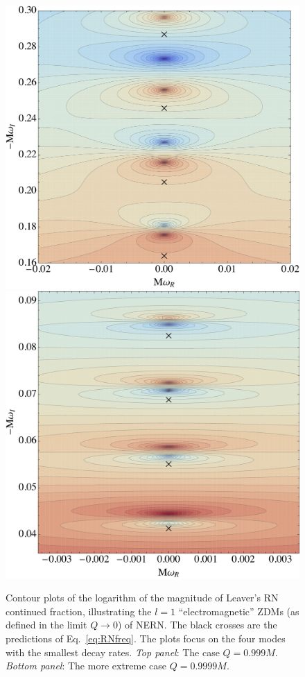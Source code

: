 \begin{refsection}
\begin{figure}[tb]
\includegraphics[width =.8 \columnwidth]{chapter_extremal/etc/RNlow.pdf}
\includegraphics[width =.8 \columnwidth]{chapter_extremal/etc/RNhigh.pdf}
\caption{Contour plots of the logarithm of the magnitude of Leaver's RN continued fraction, illustrating the $l=1$ ``electromagnetic'' ZDMs (as defined in the limit $Q \to 0$) of NERN. The black crosses are the predictions of Eq.~\eqref{eq:RNfreq}. The plots focus on the four modes with the smallest decay rates. {\it Top panel}: The case $Q=0.999M$.  {\it Bottom panel}: The more extreme case $Q=0.9999M$. }
\label{fig:RNClose}
\end{figure}



\end{refsection}
